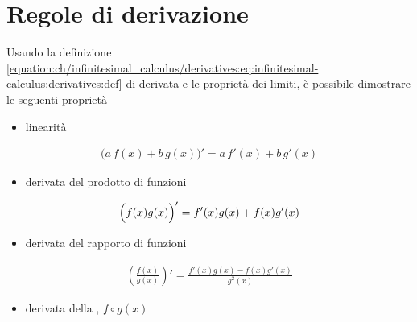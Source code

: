 \documentclass[letterpaper,10pt,italian]{jupyterBook}
\begin{document}
\section{Regole di derivazione}
\label{\detokenize{ch/infinitesimal_calculus/derivatives:regole-di-derivazione}}\label{\detokenize{ch/infinitesimal_calculus/derivatives:infinitesimal-calculus-derivatives-rules}}
\sphinxAtStartPar
Usando la definizione \eqref{equation:ch/infinitesimal_calculus/derivatives:eq:infinitesimal-calculus:derivatives:def} di derivata e le proprietà dei limiti, è possibile dimostrare le seguenti proprietà
\begin{itemize}
\item {} 
\sphinxAtStartPar
linearità

\end{itemize}
\begin{equation}\label{equation:ch/infinitesimal_calculus/derivatives:infinitesimal-calculus:derivatives:rules:linearity}
\begin{split}\big( a \, f(x) + b \, g(x) \big)' = a \, f'(x) + b \, g'(x)\end{split}
\end{equation}\begin{itemize}
\item {} 
\sphinxAtStartPar
derivata del prodotto di funzioni

\end{itemize}
\begin{equation}\label{equation:ch/infinitesimal_calculus/derivatives:infinitesimal-calculus:derivatives:rules:product}
\begin{split}\Bigl( f(x) g(x) \Bigr)' = f'(x) g(x) + f(x) g'(x)\end{split}
\end{equation}\begin{itemize}
\item {} 
\sphinxAtStartPar
derivata del rapporto di funzioni

\end{itemize}
\begin{equation}\label{equation:ch/infinitesimal_calculus/derivatives:infinitesimal-calculus:derivatives:rules:division}
\begin{split}\left( \frac{f(x)}{g(x)} \right)' = \frac{f'(x) g(x) - f(x) g'(x)}{g^2(x)}\end{split}
\end{equation}\begin{itemize}
\item {} 
\sphinxAtStartPar
derivata della {\hyperref[\detokenize{ch/precalculus/real-functions:math-hs-precalculus-real-functions-composite}]{}}, \(f \circ g (x)\)

\end{itemize}
\end{document}
